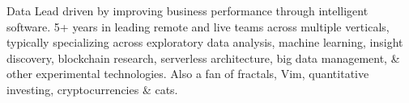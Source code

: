 

\begin{cvparagraph}
	Data Lead driven by improving business performance through intelligent software. 5+ years in leading remote and live teams across multiple verticals, typically specializing across exploratory data analysis, machine learning, insight discovery, blockchain research, serverless architecture, big data management, \& other experimental technologies. Also a fan of fractals, Vim, quantitative investing, cryptocurrencies \& cats.

\end{cvparagraph}


